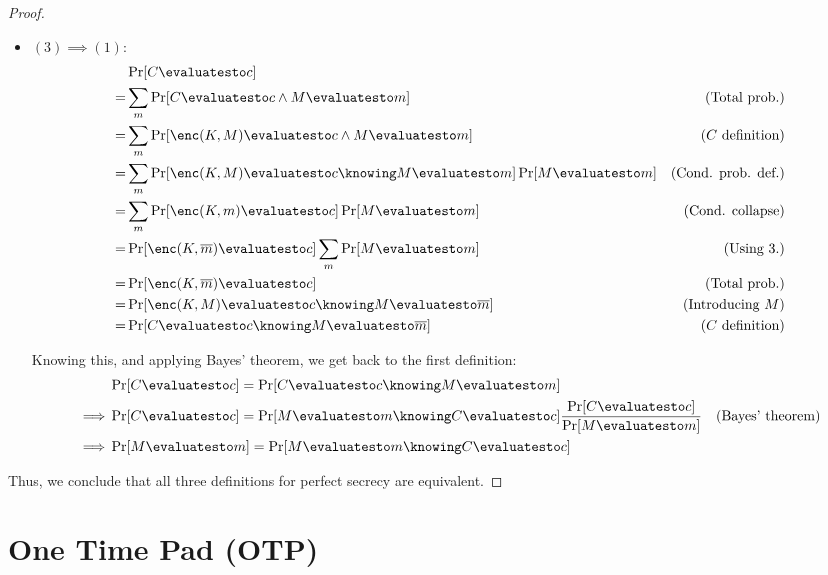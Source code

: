 \begin{proof}
\begin{itemize}
        \item $(3) \implies (1)$:
        \begin{align*}
            & \Pr[C \evaluatesto c] & \\
            =& \sum_{m}\Pr[C \evaluatesto c \wedge M \evaluatesto m] & \text{(Total prob.)} \\
            =& \sum_{m}\Pr[\enc(K, M) \evaluatesto c \wedge M \evaluatesto m] & \text{($C$ definition)} \\
            =& \sum_{m}\Pr[\enc(K, M) \evaluatesto c \knowing M \evaluatesto m]\Pr[M \evaluatesto m] & \text{(Cond. prob. def.)} \\
            =& \sum_{m}\Pr[\enc(K, m) \evaluatesto c]\Pr[M \evaluatesto m] & \text{(Cond. collapse)} \\
            =& \Pr[\enc(K, \overline{m}) \evaluatesto c] \sum_{m}\Pr[M \evaluatesto m] & \text{(Using 3.)} \\ %
            =& \Pr[\enc(K, \overline{m}) \evaluatesto c] & \text{(Total prob.)} \\
            =& \Pr[\enc(K, M) \evaluatesto c \knowing M \evaluatesto \overline{m}] & \text{(Introducing $M$)} \\
            =& \Pr[C \evaluatesto c \knowing M \evaluatesto \overline{m}] & \text{($C$ definition)}
        \end{align*}

        Knowing this, and applying Bayes' theorem, we get back to the first definition:
        \begin{align*}
            & \Pr[C \evaluatesto c] = \Pr[C \evaluatesto c \knowing M \evaluatesto m] & \\
            \implies& \Pr[C \evaluatesto c] = \Pr[M \evaluatesto m \knowing C \evaluatesto c]\frac{\Pr[C \evaluatesto c]}{\Pr[M \evaluatesto m]} & \text{(Bayes' theorem)} \\
            \implies& \Pr[M \evaluatesto m] = \Pr[M \evaluatesto m \knowing C \evaluatesto c] &
        \end{align*}

    \end{itemize}

    Thus, we conclude that all three definitions for perfect secrecy are equivalent.

\end{proof}

\section{One Time Pad (OTP)}

